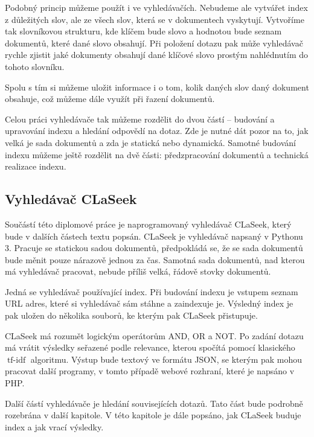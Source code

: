 \documentclass[12pt]{article}
\newcommand{\name}{CLaSeek}
\DeclareMathOperator{\tfidf}{tf-idf}
\begin{document}
Podobný princip můžeme použít i ve vyhledávačích. Nebudeme ale vytvářet index z důležitých slov, ale ze všech slov, která se v dokumentech vyskytují. Vytvoříme tak slovníkovou strukturu, kde klíčem bude slovo a hodnotou bude seznam dokumentů, které dané slovo obsahují. Při položení dotazu pak může vyhledávač rychle zjistit jaké dokumenty obsahují dané klíčové slovo prostým nahlédnutím do tohoto slovníku. 

Spolu s tím si můžeme uložit informace i o tom, kolik daných slov daný dokument obsahuje, což můžeme dále využít při řazení dokumentů. 

Celou práci vyhledávače tak můžeme rozdělit do dvou částí -- budování a upravování indexu a hledání odpovědí na dotaz. Zde je nutné dát pozor na to, jak velká je sada dokumentů a zda je statická nebo dynamická. Samotné budování indexu můžeme ještě rozdělit na dvě části: předzpracování dokumentů a technická realizace indexu. 

\subsection{Vyhledávač \name}

Součástí této diplomové práce je naprogramovaný vyhledávač \name, který bude v dalších částech textu popsán. \name{} je vyhledávač napsaný v Pythonu 3. Pracuje se statickou sadou dokumentů, předpokládá se, že se sada dokumentů bude měnit pouze nárazově jednou za čas. Samotná sada dokumentů, nad kterou má vyhledávač pracovat, nebude příliš velká, řádově stovky dokumentů. 

Jedná se vyhledávač používající index. Při budování indexu je vstupem seznam URL adres, které si vyhledávač sám stáhne a zaindexuje je. Výsledný index je pak uložen do několika souborů, ke kterým pak \name{} přistupuje. 

\name{} má rozumět logickým operátorům AND, OR a NOT. Po zadání dotazu má vrátit výsledky seřazené podle relevance, kterou spočítá pomocí klasického $\tfidf$ algoritmu. Výstup bude textový ve formátu JSON, se kterým pak mohou pracovat další programy, v tomto případě webové rozhraní, které je napsáno v PHP. 

Další částí vyhledávače je hledání souvisejících dotazů. Tato část bude podrobně rozebrána v další kapitole. V této kapitole je dále popsáno, jak \name{} buduje index a jak vrací výsledky. 

\end{document}
